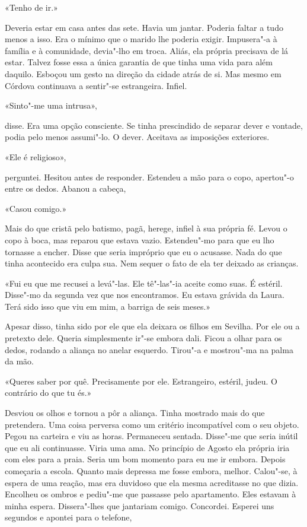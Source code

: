 «Tenho de ir.»

Deveria estar em casa antes das sete. Havia um jantar. Poderia faltar a
tudo menos a isso. Era o mínimo que o marido lhe poderia exigir.
Impusera"-a à família e à comunidade, devia"-lho em troca. Aliás, ela
própria precisava de lá estar. Talvez fosse essa a única garantia de que
tinha uma vida para além daquilo. Esboçou um gesto na direção da cidade
atrás de si. Mas mesmo em Córdova continuava a sentir"-se estrangeira.
Infiel.

«Sinto"-me uma intrusa»,

disse. Era uma opção consciente. Se tinha prescindido de separar dever e
vontade, podia pelo menos assumi"-lo. O dever. Aceitava as imposições
exteriores.

«Ele é religioso»,

perguntei. Hesitou antes de responder. Estendeu a mão para o copo,
apertou"-o entre os dedos. Abanou a cabeça,

«Casou comigo.»

Mais do que cristã pelo batismo, pagã, herege, infiel à sua própria fé.
Levou o copo à boca, mas reparou que estava vazio. Estendeu"-mo para que
eu lho tornasse a encher. Disse que seria impróprio que eu o acusasse.
Nada do que tinha acontecido era culpa sua. Nem sequer o fato de ela
ter deixado as crianças.

«Fui eu que me recusei a levá"-las. Ele tê"-las"-ia aceite como suas. É
estéril. Disse"-mo da segunda vez que nos encontramos. Eu estava grávida
da Laura. Terá sido isso que viu em mim, a barriga de seis meses.»

Apesar disso, tinha sido por ele que ela deixara os filhos em Sevilha.
Por ele ou a pretexto dele. Queria simplesmente ir"-se embora dali.
Ficou a olhar para os dedos, rodando a aliança no anelar esquerdo.
Tirou"-a e mostrou"-ma na palma da mão.

«Queres saber por quê. Precisamente por ele. Estrangeiro, estéril, judeu.
O contrário do que tu és.»

Desviou os olhos e tornou a pôr a aliança. Tinha mostrado mais do que
pretendera. Uma coisa perversa como um critério incompatível com o seu
objeto. Pegou na carteira e viu as horas. Permaneceu sentada. Disse"-me
que seria inútil que eu ali continuasse. Viria uma ama. No princípio de
Agosto ela própria iria com eles para a praia. Seria um bom momento para
eu me ir embora. Depois começaria a escola. Quanto mais depressa me
fosse embora, melhor. Calou"-se, à espera de uma reação, mas era
duvidoso que ela mesma acreditasse no que dizia. Encolheu os ombros e
pediu"-me que passasse pelo apartamento. Eles estavam à minha espera.
Dissera"-lhes que jantariam comigo. Concordei. Esperei uns segundos e
apontei para o telefone,

